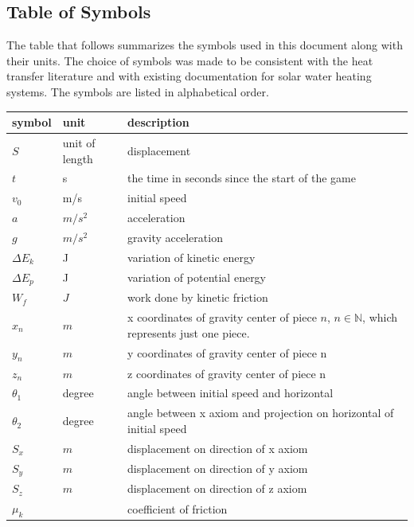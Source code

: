 \documentclass[12pt]{article}
\begin{document}
	\subsection{Table of Symbols}
	
	The table that follows summarizes the symbols used in this document along with
	their units.  The choice of symbols was made to be consistent with the heat
	transfer literature and with existing documentation for solar water heating
	systems.  The symbols are listed in alphabetical order.
	
	\renewcommand{\arraystretch}{1.2}
	\noindent \begin{longtable*}{l l p{12cm}} \toprule
		\textbf{symbol} & \textbf{unit} & \textbf{description}\\
		\midrule 
		$S$ & unit of length & displacement
		\\
		$t$ & \si[per-mode=symbol] s & the time in seconds since the start of the game
		\\  
		$v_{0}$ & \si[per-mode=symbol] m/s & initial speed
		\\ 
		$a$ & $m/s^2$ & acceleration
		\\
		$g$ & $m/s^2$ & gravity acceleration
		\\
		$\Delta E_{k}$ & J & variation of kinetic energy
		\\
		$\Delta E_{p}$ & J & variation of potential energy
		\\
		$W_{f}$ & $J$ & work done by kinetic friction
		\\
		$x_{n}$ & $m$ & x coordinates of gravity center of piece $n$, $n \in \mathbb{N}$, which represents just one piece. 
		\\
		$y_{n}$ & $m$ & y coordinates of gravity center of piece n
		\\
		$z_{n}$ & $m$ & z coordinates of gravity center of piece n
		\\
		$\theta_{1}$ & degree & angle between initial speed and horizontal
		\\
		$\theta_{2}$ & degree & angle between
		x axiom and projection on horizontal of initial speed
		\\
		$S_{x}$ & $m$ & displacement on direction of x axiom
		\\
		$S_{y}$ & $m$ & displacement on direction of y axiom
		\\
		$S_{z}$ & $m$ & displacement on direction of z axiom
		\\
		$\mu_k$ &  & coefficient of friction
		\\
		\bottomrule
	\end{longtable*}
	
\end{document}
